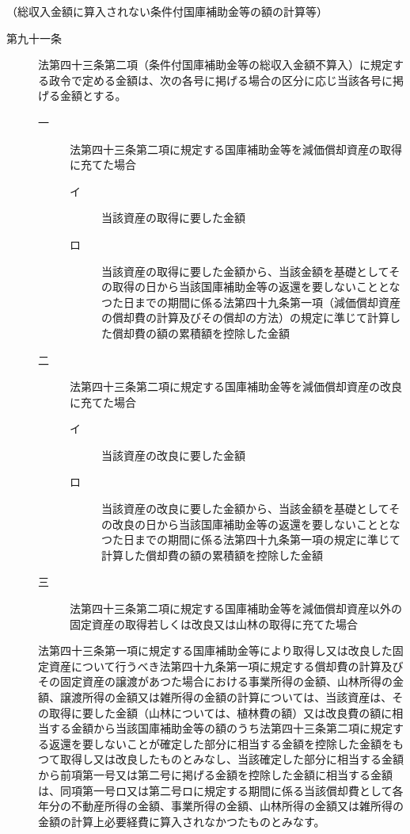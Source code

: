 \documentclass[twocolumn,a4j,10pt]{ltjtarticle}
\begin{document}
\noindent\hspace{10pt}（総収入金額に算入されない条件付国庫補助金等の額の計算等）
\begin{description}
\item[第九十一条]法第四十三条第二項（条件付国庫補助金等の総収入金額不算入）に規定する政令で定める金額は、次の各号に掲げる場合の区分に応じ当該各号に掲げる金額とする。
\begin{description}
\item[一]法第四十三条第二項に規定する国庫補助金等を減価償却資産の取得に充てた場合
\begin{description}
\item[イ]当該資産の取得に要した金額
\item[ロ]当該資産の取得に要した金額から、当該金額を基礎としてその取得の日から当該国庫補助金等の返還を要しないこととなつた日までの期間に係る法第四十九条第一項（減価償却資産の償却費の計算及びその償却の方法）の規定に準じて計算した償却費の額の累積額を控除した金額
\end{description}
\item[二]法第四十三条第二項に規定する国庫補助金等を減価償却資産の改良に充てた場合
\begin{description}
\item[イ]当該資産の改良に要した金額
\item[ロ]当該資産の改良に要した金額から、当該金額を基礎としてその改良の日から当該国庫補助金等の返還を要しないこととなつた日までの期間に係る法第四十九条第一項の規定に準じて計算した償却費の額の累積額を控除した金額
\end{description}
\item[三]法第四十三条第二項に規定する国庫補助金等を減価償却資産以外の固定資産の取得若しくは改良又は山林の取得に充てた場合
\end{description}
\item[]法第四十三条第一項に規定する国庫補助金等により取得し又は改良した固定資産について行うべき法第四十九条第一項に規定する償却費の計算及びその固定資産の譲渡があつた場合における事業所得の金額、山林所得の金額、譲渡所得の金額又は雑所得の金額の計算については、当該資産は、その取得に要した金額（山林については、植林費の額）又は改良費の額に相当する金額から当該国庫補助金等の額のうち法第四十三条第二項に規定する返還を要しないことが確定した部分に相当する金額を控除した金額をもつて取得し又は改良したものとみなし、当該確定した部分に相当する金額から前項第一号又は第二号に掲げる金額を控除した金額に相当する金額は、同項第一号ロ又は第二号ロに規定する期間に係る当該償却費として各年分の不動産所得の金額、事業所得の金額、山林所得の金額又は雑所得の金額の計算上必要経費に算入されなかつたものとみなす。
\end{description}
\end{document}
